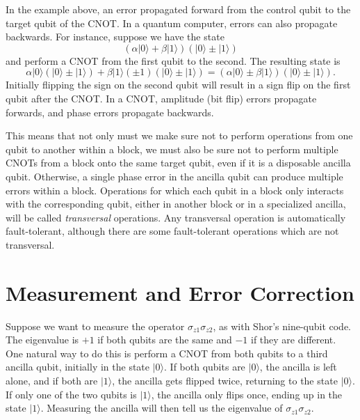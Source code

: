 \documentclass{report}
\newcommand{\ket}[1]{|{#1}\rangle}
\newcommand{\Zs}[1]{\sigma_{z{#1}}}
\begin{document}
In the example above, an error propagated forward from the control qubit 
to the target qubit of the CNOT.  In a quantum computer, errors can also 
propagate backwards.  For instance, suppose we have the state
\begin{equation}
(\alpha \ket{0} + \beta \ket{1}) (\ket{0} \pm \ket{1})
\end{equation}
and perform a CNOT from the first qubit to the second.  The resulting state 
is
\begin{equation}
\alpha \ket{0} (\ket{0} \pm \ket{1}) + \beta \ket{1} (\pm 1) (\ket{0} \pm 
\ket{1}) = (\alpha \ket{0} \pm \beta \ket{1}) (\ket{0} \pm \ket{1}).
\end{equation}
Initially flipping the sign on the second qubit will result in a sign flip on 
the first qubit after the CNOT.  In a CNOT, amplitude (bit flip) errors 
propagate forwards, and phase errors propagate backwards.

This means that not only must we make sure not to perform operations 
from one qubit to another within a block, we must also be sure not to 
perform multiple CNOTs from a block onto the same target qubit, even if it 
is a disposable ancilla qubit.  Otherwise, a single phase error in the ancilla
qubit can produce multiple errors within a block.  Operations for which each 
qubit in a block only interacts with the corresponding qubit, either in another 
block or in a specialized ancilla, will be called {\em transversal} operations. 
Any transversal operation is automatically fault-tolerant, although there are 
some fault-tolerant operations which are not transversal.

\section{Measurement and Error Correction}
\label{sec-error-cor}

Suppose we want to measure the operator $\Zs{1} \Zs{2}$, as with Shor's 
nine-qubit code.  The eigenvalue is $+1$ if both qubits are the same and $-1$ 
if they are different.  One natural way to do this is perform a CNOT from 
both qubits to a third ancilla qubit, initially in the state $\ket{0}$.  If 
both qubits are $\ket{0}$, the ancilla is left alone, and if both are 
$\ket{1}$, the ancilla gets flipped twice, returning to the state $\ket{0}$.  
If only one of the two qubits is $\ket{1}$, the ancilla only flips once, ending 
up in the state $\ket{1}$.  Measuring the ancilla will then tell us the 
eigenvalue of $\Zs{1} \Zs{2}$.
\end{document}
